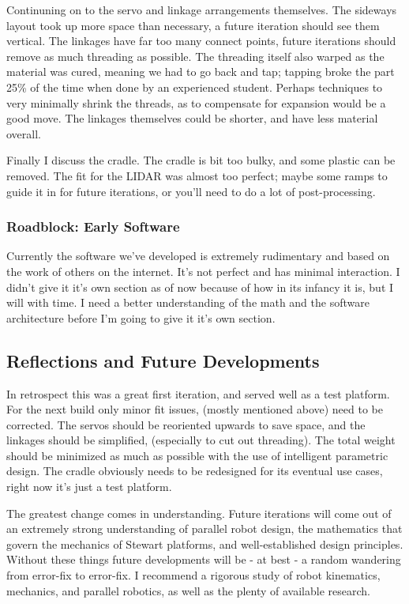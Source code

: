 \documentclass[a4paper, 10pt]{article}
\begin{document}
		Continuning on to the servo and linkage arrangements themselves. The sideways layout took up more space than necessary, a future iteration should see them vertical. The linkages have far too many connect points, future iterations should remove as much threading as possible. The threading itself also warped as the material was cured, meaning we had to go back and tap; tapping broke the part 25\% of the time when done by an experienced student. Perhaps techniques to very minimally shrink the threads, as to compensate for expansion would be a good move. The linkages themselves could be shorter, and have less material overall.
		
		Finally I discuss the cradle. The cradle is  bit too bulky, and some plastic can be removed. The fit for the LIDAR was almost too perfect; maybe some ramps to guide it in for future iterations, or you'll need to do a lot of post-processing. 
		
		\subsubsection{Roadblock: Early Software}
		Currently the software we've developed is extremely rudimentary and based on the work of others on the internet. It's not perfect and has minimal interaction. I didn't give it it's own section as of now because of how in its infancy it is, but I will with time. I need a better understanding of the math and the software architecture before I'm going to give it it's own section.
		
	\subsection{Reflections and Future Developments}
	In retrospect this was a great first iteration, and served well as a test platform. For the next build only minor fit issues, (mostly mentioned above) need to be corrected. The servos should be reoriented upwards to save space, and the linkages should be simplified, (especially to cut out threading). The total weight should be minimized as much as possible with the use of intelligent parametric design. The cradle obviously needs to be redesigned for its eventual use cases, right now it's just a test platform.
	
	The greatest change comes in understanding. Future iterations will come out of an extremely strong understanding of parallel robot design, the mathematics that govern the mechanics of Stewart platforms, and well-established design principles. Without these things future developments will be - at best - a random wandering from error-fix to error-fix. I recommend a rigorous study of robot kinematics, mechanics, and parallel robotics, as well as the plenty of available research. 
	
\end{document}
